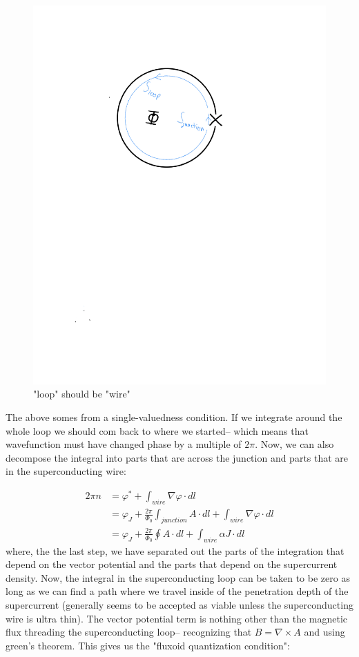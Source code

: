 \documentclass[paper=a4, twocolumn, fontsize=10pt]{article} %
\numberwithin{equation}{section} %
\numberwithin{figure}{section} %
\numberwithin{table}{section} %
\begin{document}
\begin{figure}[H]
    \centering
    \includegraphics[scale=.5]{JJ_loop.pdf}
    \caption{ "loop" should be "wire"}
    \end{figure}

The above somes from a single-valuedness condition. If we integrate around the whole loop we should com back to where we started-- which means that wavefunction must have changed phase by a multiple of $2\pi$. Now, we can also decompose the integral into parts that are across the junction and parts that are in the superconducting wire:


\begin{align}
    2\pi n &= \varphi^* + \int_{wire} \nabla \varphi \cdot dl
    \\
    &= \varphi_J +  \frac{2\pi}{\Phi_0} \int_{junction} A  \cdot dl + \int_{wire} \nabla \varphi \cdot dl
    \\
    &= \varphi_J +  \frac{2\pi}{\Phi_0} \oint A  \cdot dl + \int_{wire} \alpha J  \cdot dl
\end{align}
where, the the last step, we have separated out the parts of the integration that depend on the vector potential and the parts that depend on the supercurrent density. Now, the integral in the superconducting loop can be taken to be zero as long as we can find a path where we travel inside of the penetration depth of the supercurrent (generally seems to be accepted as viable unless the superconducting wire is ultra thin). The vector potential term is nothing other than the magnetic flux threading the superconducting loop-- recognizing that $B = \nabla \times A$ and using green's theorem. This gives us the "fluxoid quantization condition":
\end{document}
